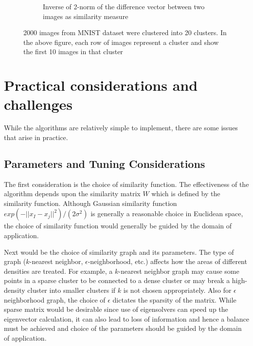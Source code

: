 \documentclass[10pt,a4paper, nocenter]{report}
\newcommand{\norm}[1]{\lvert\lvert {#1} \rvert\rvert}
\begin{document}
\begin{enumerate}
\begin{figure}[h]
\begin{center}
\begin{subfigure}[b]{0.4\textwidth}
                    \caption{Inverse of 2-norm of the difference vector between two images as similarity measure}
                    \label{fig:clustering_20_2norm}
                \end{subfigure}
            \end{center}
            \caption{2000 images from MNIST dataset were clustered into 20 clusters. In the above figure, each row of images represent a cluster and show the first 10 images in that cluster}
            \label{fig:mnistImages}
        \end{figure}

        
    \end{enumerate}
    
    
    \section{Practical considerations and challenges}

    While the algorithms are relatively simple to implement, there are some issues that arise in practice. 
    
    \subsection{Parameters and Tuning Considerations}
    The first consideration is the choice of similarity function. The effectiveness of the algorithm depends upon the similarity matrix $W$ which is defined by the similarity function. Although Gaussian similarity function $exp(-\norm{x_I - x_j}^2)/(2\sigma^2)$ is generally a reasonable choice in Euclidean space, the choice of similarity function would generally be guided by the domain of application. 

    Next would be the choice of similarity graph and its parameters. The type of graph ($k$-nearest neighbor, $\epsilon$-neighborhood, etc.) affects how the areas of different densities are treated. For example, a $k$-nearest neighbor graph may cause some points in a sparse cluster to be connected to a dense cluster or may break a high-density cluster into smaller clusters if $k$ is not chosen appropriately. Also for $\epsilon$ neighborhood graph, the choice of $\epsilon$ dictates the sparsity of the matrix. While sparse matrix would be desirable since use of eigensolvers can speed up the eigenvector calculation, it can also lead to loss of information and hence a balance must be achieved and choice of the parameters should be guided by the domain of application. 
\end{document}
